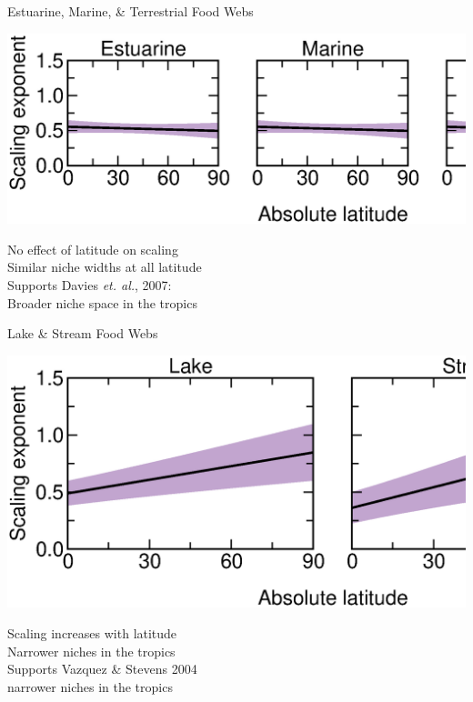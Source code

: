 \documentclass{beamer}
\begin{document}
  \begin{frame}{Estuarine, Marine, \& Terrestrial Food Webs}
    \begin{center}
      \includegraphics*[width=.8\textwidth]{Figures/results/no_effect.eps}

      \vspace{1cm}
      No effect of latitude on scaling\\
      Similar niche widths at all latitude\\
      Supports Davies \emph{et. al.}, 2007:\\
      Broader niche space in the tropics

    \end{center}
  \end{frame}


  \begin{frame}{Lake \& Stream Food Webs}
    \begin{center}
      \includegraphics*[width=.8\textwidth]{Figures/results/effect.eps}

      \vspace{1cm}
      {\color{white} Scaling increases with latitude\\
      Narrower niches in the tropics\\
      Supports Vazquez \& Stevens 2004\\}
      {\color{white} narrower niches in the tropics}

    \end{center}
  \end{frame}
\end{document}
